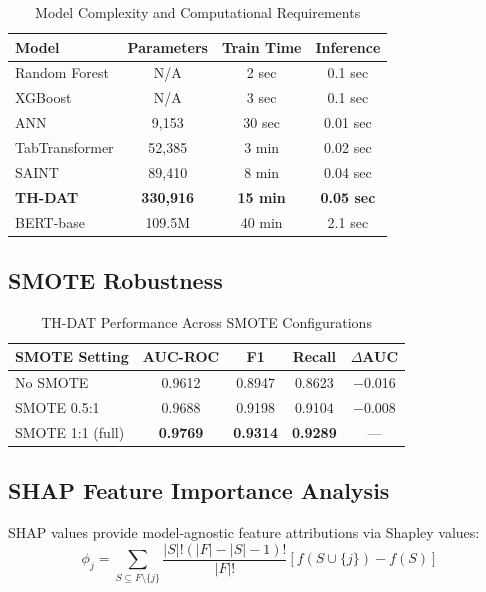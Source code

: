 \documentclass[12pt,a4paper]{article}
\begin{document}
\begin{table}[htbp]
\caption{Model Complexity and Computational Requirements}
\label{tab:complexity}
\centering
\begin{tabular}{lccc}
\toprule
\textbf{Model} & \textbf{Parameters} & \textbf{Train Time} & \textbf{Inference} \\
\midrule
Random Forest & N/A & 2 sec & 0.1 sec \\
XGBoost & N/A & 3 sec & 0.1 sec \\
ANN & 9,153 & 30 sec & 0.01 sec \\
TabTransformer & 52,385 & 3 min & 0.02 sec \\
SAINT & 89,410 & 8 min & 0.04 sec \\
\textbf{TH-DAT} & \textbf{330,916} & \textbf{15 min} & \textbf{0.05 sec} \\
BERT-base & 109.5M & 40 min & 2.1 sec \\
\bottomrule
\end{tabular}
\end{table}

\subsection{SMOTE Robustness}

\begin{table}[htbp]
\caption{TH-DAT Performance Across SMOTE Configurations}
\label{tab:smoterobust}
\centering
\begin{tabular}{lcccc}
\toprule
\textbf{SMOTE Setting} & \textbf{AUC-ROC} & \textbf{F1} & \textbf{Recall} & \textbf{$\Delta$AUC} \\
\midrule
No SMOTE & 0.9612 & 0.8947 & 0.8623 & $-$0.016 \\
SMOTE 0.5:1 & 0.9688 & 0.9198 & 0.9104 & $-$0.008 \\
SMOTE 1:1 (full) & \textbf{0.9769} & \textbf{0.9314} & \textbf{0.9289} & --- \\
\bottomrule
\end{tabular}
\end{table}

\subsection{SHAP Feature Importance Analysis}

SHAP\cite{lundberg2017} values provide model-agnostic feature attributions via Shapley values:
\begin{equation}
\phi_j = \sum_{S \subseteq F \setminus \{j\}} \frac{|S|!(|F|-|S|-1)!}{|F|!} [f(S \cup \{j\}) - f(S)]
\end{equation}
\end{document}
